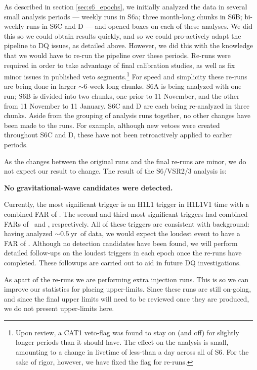 As described in section \ref{sec:s6_epochs}, we initially analyzed the data in several small analysis periods --- weekly runs in S6a; three month-long chunks in S6B; bi-weekly runs in S6C and D --- and opened boxes on each of these analyses. We did this so we could obtain results quickly, and so we could pro-actively adapt the pipeline to \ac{DQ} issues, as detailed above. However, we did this with the knowledge that we would have to re-run the pipeline over these periods. Re-runs were required in order to take advantage of final calibration studies, as well as fix minor issues in published veto segments.\footnote{Upon review, a CAT1 veto-flag was found to stay on (and off) for slightly longer periods than it should have. The effect on the analysis is small, amounting to a change in livetime of less-than a day across all of S6. For the sake of rigor, however, we have fixed the flag for re-runs.} For speed and simplicity these re-runs are being done in larger $\sim6$-week long chunks. S6A is being analyzed with one run; S6B is divided into two chunks, one prior to 11 November, and the other from 11 November to 11 January. S6C and D are each being re-analyzed in three chunks. Aside from the grouping of analysis runs together, no other changes have been made to the runs. For example, although new vetoes were created throughout S6C and D, these have not been retroactively applied to earlier periods.

As the changes between the original runs and the final re-runs are minor, we do not expect our result to change. The result of the S6/VSR2/3 analysis is:
\begin{center}
\textbf{No gravitational-wave candidates were detected.}
\end{center}
Currently, the most significant trigger is an H1L1 trigger in H1L1V1 time with a
combined FAR of \firstFAR. The second and third most significant triggers had
combined FARs of \secondFAR~and \thirdFAR, respectively. All of these triggers
are consistent with background: having analyzed
$\mathrm{\sim0.5~yr}$~of data, we would expect the loudest event to
have a FAR of \expectedLoudestFAR. Although no detection candidates have been found,
 we will perform detailed follow-ups on the loudest triggers in each epoch once the re-runs have completed. These followups are carried out to aid in future \ac{DQ} investigations.

As apart of the re-runs we are performing extra injection runs. This is so we can improve our statistics for placing upper-limits. Since these runs are still on-going, and since the final upper limits will need to be reviewed once they are produced, we do not present upper-limits here.

